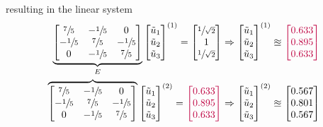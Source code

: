 resulting in the linear system
\begin{align*}
	\underbrace{
		\begin{bmatrix}
			\sfrac{7}{5} & -\sfrac{1}{5} & 0 \\
			-\sfrac{1}{5} & \sfrac{7}{5} & -\sfrac{1}{5} \\
			0 & -\sfrac{1}{5} & \sfrac{7}{5}
		\end{bmatrix}
	}_{E}
	\begin{bmatrix}
		\tilde{u}_1 \\
		\tilde{u}_2 \\
		\tilde{u}_3 \\
	\end{bmatrix}^{(1)}
	=
	\begin{bmatrix}
		\sfrac{1}{\sqrt{2}} \\
		1 \\
		\sfrac{1}{\sqrt{2}}
	\end{bmatrix}
	& \Rightarrow
	\begin{bmatrix}
		\tilde{u}_1 \\
		\tilde{u}_2 \\
		\tilde{u}_3 \\
	\end{bmatrix}^{(1)}
	\approxeq
	{\color{purple}
	\begin{bmatrix}
		0.633 \\
		0.895 \\
		0.633
	\end{bmatrix}
	} \\
	\overbrace{
		\begin{bmatrix}
			\sfrac{7}{5} & -\sfrac{1}{5} & 0 \\
			-\sfrac{1}{5} & \sfrac{7}{5} & -\sfrac{1}{5} \\
			0 & -\sfrac{1}{5} & \sfrac{7}{5}
		\end{bmatrix}
	}
	\begin{bmatrix}
		\tilde{u}_1 \\
		\tilde{u}_2 \\
		\tilde{u}_3 \\
	\end{bmatrix}^{(2)}
	= {\color{purple}
	\begin{bmatrix}
		0.633 \\
		0.895 \\
		0.633
	\end{bmatrix}
	}
	& \Rightarrow
	\begin{bmatrix}
		\tilde{u}_1 \\
		\tilde{u}_2 \\
		\tilde{u}_3 \\
	\end{bmatrix}^{(2)}
	\approxeq
	\begin{bmatrix}
		0.567 \\
		0.801 \\
		0.567
	\end{bmatrix}
\end{align*}
